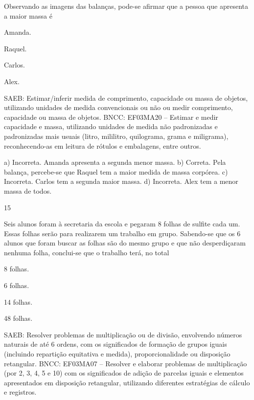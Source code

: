 {\begin{escolha}
{Observando as imagens das balanças, pode-se afirmar que a pessoa que apresenta a maior massa é

\begin{escolha}

\item
  Amanda.
\item
  Raquel.
\item
  Carlos.
\item
  Alex.
\end{escolha}


SAEB: Estimar/inferir medida de comprimento, capacidade ou
massa de objetos, utilizando unidades de medida convencionais ou não ou
medir comprimento, capacidade ou massa de objetos.
BNCC: EF03MA20 -- Estimar e medir capacidade e massa, utilizando unidades de medida não
padronizadas e padronizadas mais usuais (litro, mililitro, quilograma, grama e miligrama),
reconhecendo-as em leitura de rótulos e embalagens, entre outros.

a) Incorreta. Amanda apresenta a segunda menor massa.
b) Correta. Pela balança, percebe-se que Raquel tem a maior medida de massa corpórea.
c) Incorreta. Carlos tem a segunda maior massa.
d) Incorreta. Alex tem a menor massa de todos.

\num{15}

Seis alunos foram à secretaria da escola e pegaram 8 folhas de sulfite cada um. Essas folhas serão para realizarem um trabalho em grupo. Sabendo-se que os 6 alunos que foram buscar as folhas são do mesmo grupo
e que não desperdiçaram nenhuma folha, conclui-se que o trabalho terá, no total

\begin{escolha}

\item
  8 folhas.
\item
  6 folhas.
\item
  14 folhas.
\item
  48 folhas.
\end{escolha}

SAEB: Resolver problemas de multiplicação ou de divisão, envolvendo números naturais de até 6 ordens, com os significados de formação de grupos iguais (incluindo repartição equitativa e medida), proporcionalidade ou disposição retangular.
BNCC: EF03MA07 – Resolver e elaborar problemas de multiplicação (por 2, 3, 4, 5 e 10) com os
significados de adição de parcelas iguais e elementos apresentados em disposição retangular,
utilizando diferentes estratégias de cálculo e registros.

}
\end{escolha}}
